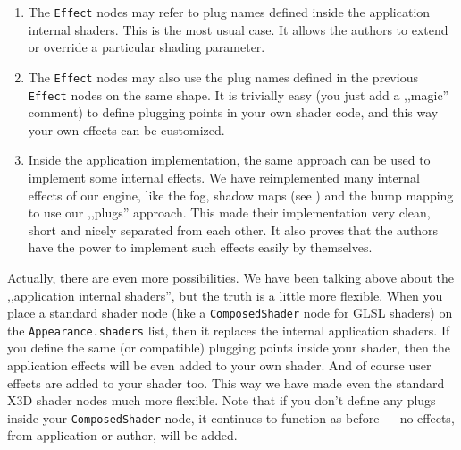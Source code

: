 \documentclass{egpubl}
\begin{document}
\begin{enumerate}

\item The \texttt{Effect} nodes may refer to plug names
defined inside the application internal shaders. This is the most usual case.
It allows the authors to extend or override a particular shading parameter.

\item The \texttt{Effect} nodes may also use the plug names defined
in the previous \texttt{Effect} nodes on the same shape.
It is trivially easy (you just add a ,,magic'' comment) to define
plugging points in your own shader code, and this way your own effects
can be customized.

\item Inside the application implementation, the same approach can be used
to implement some internal effects.
We have reimplemented many internal effects of our engine,
like the fog, shadow maps (see \cite{vrmleng:shadowmaps})
and the bump mapping to use our ,,plugs'' approach.
This made their implementation very clean, short
and nicely separated from each other. It also proves that
the authors have the power to implement such effects easily by themselves.



\end{enumerate}

Actually, there are even more possibilities.
We have been talking above about the ,,application internal shaders'',
but the truth is a little more flexible.
When you place a standard shader node
(like a \texttt{ComposedShader} node for GLSL shaders) on the
\texttt{Appearance.shaders} list,
then it replaces the internal application shaders.
If you define the same (or compatible) plugging points inside your shader,
then the application effects will be even added to your own
shader. And of course user effects are added to your shader too.
This way we have made even the standard X3D shader nodes much more flexible.
Note that if you don't define any plugs inside your \texttt{ComposedShader} node,
it continues to function as before --- no effects, from application or author,
will be added.
\end{document}
